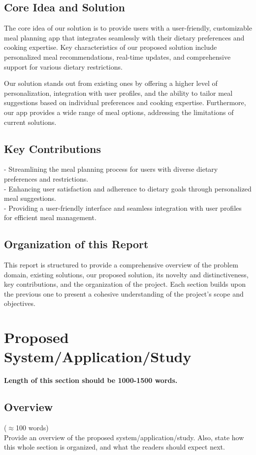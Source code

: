\documentclass[12pt]{article}
\begin{document}
\subsection{Core Idea and Solution}
The core idea of our solution is to provide users with a user-friendly, customizable meal planning app that integrates seamlessly with their dietary preferences and cooking expertise. Key characteristics of our proposed solution include personalized meal recommendations, real-time updates, and comprehensive support for various dietary restrictions.

Our solution stands out from existing ones by offering a higher level of personalization, integration with user profiles, and the ability to tailor meal suggestions based on individual preferences and cooking expertise. Furthermore, our app provides a wide range of meal options, addressing the limitations of current solutions.
\subsection{Key Contributions}
- Streamlining the meal planning process for users with diverse dietary preferences and restrictions.
\\- Enhancing user satisfaction and adherence to dietary goals through personalized meal suggestions.
\\- Providing a user-friendly interface and seamless integration with user profiles for efficient meal management.
\subsection{Organization of this Report}
This report is structured to provide a comprehensive overview of the problem domain, existing solutions, our proposed solution, its novelty and distinctiveness, key contributions, and the organization of the project. Each section builds upon the previous one to present a cohesive understanding of the project's scope and objectives.




\section{Proposed System/Application/Study}\label{chap:proposed}

\textbf{Length of this section should be 1000-1500 words.}

\subsection{Overview} 
($\approx$100 words)\\
Provide an overview of the proposed system/application/study. Also, state how this whole section is organized, and what the readers should expect next.
\end{document}
